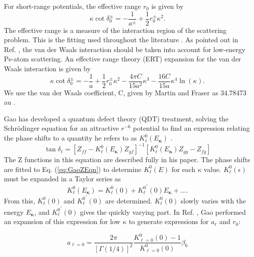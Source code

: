 \documentclass[preprint,showpacs,preprintnumbers,amsmath,amssymb,longbibliography,pra,aps]{revtex4-1}
\begin{document}
For short-range potentials, the effective range $r_0$ is given by \cite{Bethe1949,Blatt1949}
\begin{equation}
\label{eq:EffectiveRangeShort}
\kappa \cot\delta_0^\pm = -\frac{1}{a^\pm} + \frac{1}{2} r_0^\pm \kappa^2.
\end{equation}
The effective range is a measure of the interaction region of the scattering problem. This is the fitting used throughout the literature \cite{Ivanov2002,VanReeth2003,Blackwood2002,Walters2004}. As pointed out in Ref. \cite{Fabrikant2014}, the van der Waals interaction should be taken into account for low-energy Ps-atom scattering. An effective range theory (ERT) expansion for the van der Waals interaction is given by \cite{Drake2006}
\begin{equation}
\label{eq:EffectiveRangeLongAu}
\kappa \cot\delta_0^\pm = -\frac{1}{a} + \frac{1}{2} r_0^\pm \kappa^2 - \frac{4 \pi C}{15 a^2} \kappa^3 - \frac{16 C}{15 a} \kappa^4 \ln \left(\kappa \right).
\end{equation}
We use the van der Waals coefficient, C, given by Martin and Fraser as 34.78473 au \cite{Martin1980}.

Gao has developed a quantum defect theory (QDT) treatment, solving the Schr\"{o}dinger equation for an attractive $r^{-6}$ potential to find an expression relating the phase shifts to a quantity he refers to as $K_\ell^0(E_{\bm \kappa})$ \cite{Gao1998}.
\begin{equation}
\label{eq:GaoZEqn}
\tan\delta_\ell = [Z_{ff} - K_\ell^0(E_{\bm \kappa}) Z_{gf}]^{-1} [K_\ell^0(E_{\bm \kappa}) Z_{gg} - Z_{fg}]
\end{equation}
The Z functions in this equation are described fully in his paper. The phase shifts are fitted to Eq. (\ref{eq:GaoZEqn}) to determine $K_\ell^0(E)$ for each $\kappa$ value. $K_\ell^0(\epsilon)$ must be expanded in a Taylor series as
\begin{equation}
\label{eq:GaoKTaylor}
K_\ell^0(E_{\bm \kappa}) = K_\ell^0(0) + {K_\ell^0}^\prime(0) E_{\bm \kappa} + \ldots.
\end{equation}
From this, $K_\ell^0(0)$ and ${K_\ell^0}^\prime(0)$ are determined. $K_\ell^0(0)$ slowly varies with the energy $E_{\bm \kappa}$, and ${K_\ell^0}^\prime(0)$ gives the quickly varying part. In Ref. \cite{Gao1998a}, Gao performed an expansion of this expression for low $\kappa$ to generate expressions for $a_\ell$ and $r_0$:

\begin{equation}
\label{eq:GaoScatLenS}
a_{\ell=0} = \frac{2\pi}{[\Gamma(1/4)]^2} \frac{K_{\ell=0}^0(0) - 1}{K_{\ell=0}^0(0)} \beta_6
\end{equation}
\end{document}
